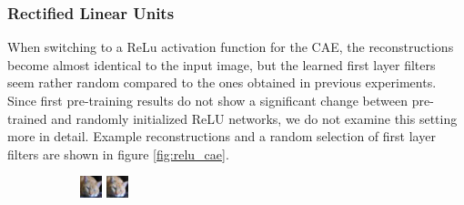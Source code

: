 \documentclass{article}
\begin{document}
    \subsubsection{Rectified Linear Units}
      When switching to a ReLu activation function \citep{nair2010rectified} for the CAE, the reconstructions become almost identical to the input image, but the learned first layer filters seem rather random compared to the ones obtained in previous experiments. Since first pre-training results do not show a significant change between pre-trained and randomly initialized ReLU networks, we do not examine this setting more in detail. Example reconstructions and a random selection of first layer filters are shown in figure \ref{fig:relu_cae}.

      \begin{figure}[b]

      \centering

				\begin{subfigure}{0.4\linewidth}

					\centering
					\includegraphics[width=0.4\linewidth]{../graphics/reconstructions/cifar/relu/input_00_relu.png}
					\includegraphics[width=0.4\linewidth]{../graphics/reconstructions/cifar/relu/reconstruction_00_relu.png}

				\end{subfigure}
				\begin{subfigure}{0.4\linewidth}


\end{subfigure}
\end{figure}
\end{document}
